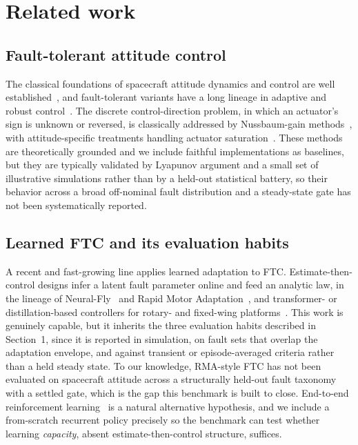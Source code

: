 \documentclass[11pt]{article}
\begin{document}
\section{Related work}
\subsection{Fault-tolerant attitude control} The classical foundations of spacecraft attitude
dynamics and control are well established~\cite{Schaub2018,Wie2008}, and fault-tolerant variants have
a long lineage in adaptive and robust control~\cite{IoannouSun1996}. The discrete control-direction
problem, in which an actuator's sign is unknown or reversed, is classically addressed by
Nussbaum-gain methods~\cite{Nussbaum1983}, with attitude-specific treatments handling actuator
saturation~\cite{Hu2018}. These methods are theoretically grounded and we include faithful
implementations as baselines, but they are typically validated by Lyapunov argument and a small set
of illustrative simulations rather than by a held-out statistical battery, so their behavior across a
broad off-nominal fault distribution and a steady-state gate has not been systematically reported.

\subsection{Learned FTC and its evaluation habits} A recent and fast-growing line applies learned
adaptation to FTC. Estimate-then-control designs infer a latent fault parameter online and feed
an analytic law, in the lineage of Neural-Fly~\cite{OConnell2022} and Rapid Motor
Adaptation~\cite{Kumar2021}, and transformer- or distillation-based controllers for rotary- and
fixed-wing platforms~\cite{Kim2025,Giral2024}. This work is genuinely capable, but it inherits the
three evaluation habits described in Section~1, since it is reported in simulation, on fault sets
that overlap the adaptation envelope, and against transient or episode-averaged criteria rather than
a held steady state. To our knowledge, RMA-style FTC has not been evaluated on spacecraft attitude
across a structurally held-out fault taxonomy with a settled gate, which is the gap this benchmark is
built to close. End-to-end reinforcement learning~\cite{SuttonBarto2018} is a natural alternative
hypothesis, and we include a from-scratch recurrent policy precisely so the benchmark can test
whether learning \emph{capacity}, absent estimate-then-control structure, suffices.
\end{document}

